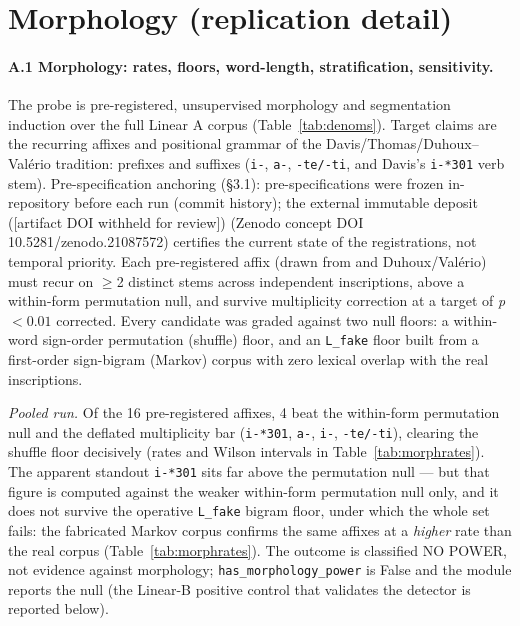 
\nocite{*}


\appendix

\section{Morphology (replication detail)}

\paragraph{A.1 Morphology: rates, floors, word-length, stratification,
sensitivity.} The probe is pre-registered, unsupervised morphology and
segmentation induction over the full Linear A corpus
(Table~\ref{tab:denoms}). Target claims are the recurring affixes and
positional grammar of the Davis/Thomas/Duhoux--Val\'{e}rio tradition:
prefixes and suffixes (\texttt{i-}, \texttt{a-}, \texttt{-te/-ti}, and
Davis's \texttt{i-*301} verb stem). Pre-specification anchoring (\S3.1):
pre-specifications were frozen in-repository before each run (commit
history); the external immutable deposit
\ifanon
([artifact DOI withheld for review])
\else
(Zenodo concept DOI 10.5281/zenodo.21087572)
\fi
certifies the current state of the registrations, not temporal priority.
Each pre-registered affix
(drawn from \citet{thomas2020} and Duhoux/Val\'{e}rio) must recur on
$\ge$2 distinct stems across independent inscriptions, above a
within-form permutation null, and survive multiplicity correction at a
target of \emph{p} $< 0.01$ corrected. Every candidate was graded against two
null floors: a within-word sign-order permutation (shuffle) floor, and an
\texttt{L\_fake} floor built from a first-order sign-bigram (Markov) corpus
with zero lexical overlap with the real inscriptions.

\emph{Pooled run.} Of the 16 pre-registered affixes, 4 beat the within-form
permutation null and the deflated multiplicity bar (\texttt{i-*301},
\texttt{a-}, \texttt{i-}, \texttt{-te/-ti}), clearing the shuffle floor
decisively (rates and Wilson intervals in Table~\ref{tab:morphrates}).
The apparent standout \texttt{i-*301} sits far above the permutation null
--- but that figure is computed against the weaker within-form permutation
null only, and it does not survive the operative \texttt{L\_fake} bigram
floor, under which the whole set fails: the fabricated Markov corpus
confirms the same affixes at a \emph{higher} rate than the real corpus
(Table~\ref{tab:morphrates}). The outcome is classified NO POWER, not
evidence against morphology; \texttt{has\_morphology\_power} is False and
the module reports the null (the Linear-B positive control that validates
the detector is reported below).

